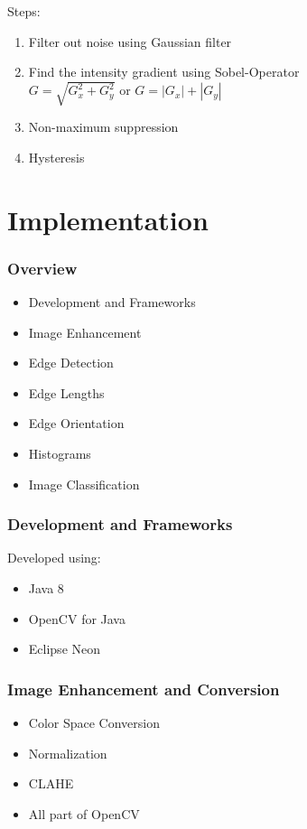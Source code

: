\documentclass{beamer}
\begin{document}
\begin{frame}
	\begin{block}{Steps:}
		\begin{enumerate}
			\item Filter out noise using Gaussian filter
			\item Find the intensity gradient using Sobel-Operator\\
			$G = \sqrt{G_x^2 + G_y^2}$ or  $G = |G_x| + |G_y|$
			\item Non-maximum suppression
			\item Hysteresis
		\end{enumerate}
	\end{block}
\end{frame}


\section{Implementation}

\begin{frame}
	\frametitle{Overview}
	\begin{itemize}
		\item Development and Frameworks
		\item Image Enhancement
		\item Edge Detection
		\item Edge Lengths
		\item Edge Orientation
		\item Histograms
		\item Image Classification
	\end{itemize}
\end{frame}


\begin{frame}
	\frametitle{Development and Frameworks}
	Developed using:
	\begin{itemize}
		\item Java 8
		\item OpenCV for Java
		\item Eclipse Neon
	\end{itemize}
	
\end{frame}

\begin{frame}
	\frametitle{Image Enhancement and Conversion}
	\begin{block}{}
		\begin{itemize}
			\item Color Space Conversion
			\item Normalization
			\item CLAHE
			\item All part of OpenCV
		\end{itemize}
	\end{block}
	
\end{frame}
\end{document}

